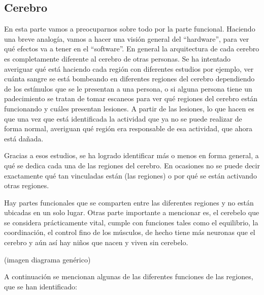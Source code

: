 \subsection{Cerebro}

En esta parte vamos a preocuparnos sobre todo por la parte funcional. Haciendo una breve analogía, vamos a hacer una visión general del “hardware”, para ver qué efectos va a tener en el “software”. 
En general la arquitectura de cada cerebro es completamente diferente al cerebro de otras personas. Se ha intentado averiguar qué está haciendo cada región con diferentes estudios por ejemplo,  ver cuánta sangre se está bombeando en diferentes regiones del cerebro dependiendo de los estímulos que se le presentan a una persona, o si alguna persona tiene un padecimiento se tratan de tomar escaneos para ver qué regiones del cerebro están funcionando y cuáles presentan lesiones. A partir de las lesiones, lo que hacen es que una vez que está identificada la actividad que ya no se puede realizar de forma normal, averiguan qué región era responsable de esa actividad, que ahora está dañada.

Gracias a esos estudios, se ha logrado identificar más o menos en forma general, a qué se dedica cada una de las regiones del cerebro. En ocasiones no se puede decir exactamente qué tan vinculadas están (las regiones) o por qué se están activando otras regiones.

Hay partes funcionales que se comparten entre las diferentes regiones y no están ubicadas en un solo lugar. Otras parte importante a mencionar es, el cerebelo que se considera prácticamente vital, cumple con funciones tales como el equilibrio, la coordinación, el control fino de los músculos, de hecho tiene más neuronas que el cerebro y aún así hay niños que nacen y viven sin cerebelo. 

(imagen diagrama genérico)

A continuación se mencionan algunas de las diferentes funciones de las regiones, que se han identificado: 

